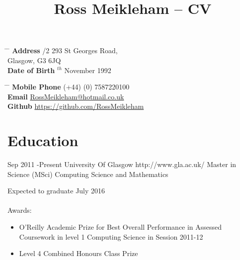 \documentclass[10pt]{article} %
\begin{document}

\title{Ross Meikleham -- CV} %


\parbox{0.5\textwidth}{ %
\begin{tabbing} %
\hspace{3cm} \= \hspace{4cm} \= \kill %
{\bf Address} /2 293 St Georges Road,\\ %
\> Glasgow, G3 6JQ \\ %
{\bf Date of Birth} $^{th}$ November 1992 \\ %

\end{tabbing}}
\hfill %
\parbox{0.5\textwidth}{ %
\begin{tabbing} %
\hspace{3cm} \= \hspace{4cm} \= \kill %
{\bf Mobile Phone} \> (+44) (0) 7587220100 \\ %
{\bf Email} \> \href{mailto:rossmeikleham@hotmail.co.uk}{RossMeikleham@hotmail.co.uk} \\ %
{\bf Github} \> \href{https://github.com/RossMeikleham}{https://github.com/RossMeikleham}  %
\end{tabbing}}
\section{Education}

\job
{Sep 2011 -}{Present}
{University Of Glasgow}
{http://www.gla.ac.uk/}
{Master in Science (MSci) Computing Science and Mathematics}
{Expected to graduate July 2016\\\\
Awards:
\begin{itemize}
\item{O’Reilly Academic Prize for Best Overall Performance in Assessed Coursework in level 1 Computing Science in Session 2011-12}
\item{Level 4 Combined Honours Class Prize}
\end{itemize}}
\end{document}
